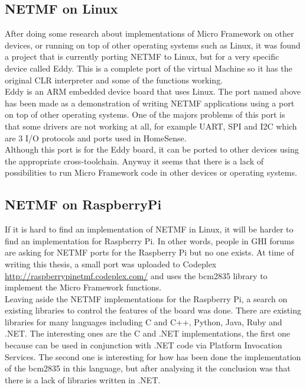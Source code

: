 \subsection{NETMF on Linux}\label{S:SOTA-NETMF-Linux}
After doing some research about implementations of Micro Framework on other devices, or running on top of other operating systems such as Linux, it was found a project that is currently porting NETMF to Linux, but for a very specific device called Eddy. This is a complete port of the virtual Machine so it has the original CLR interpreter and some of the functions working.
\\
Eddy is an ARM embedded device board that uses Linux. The port named above has been made as a demonstration of writing NETMF applications using a port on top of other operating systems. One of the majors problems of this port is that some drivers are not working at all, for example UART, SPI and \gls{I2C} which are 3 I/O protocols and ports used in HomeSense.
\\
Although this port is for the Eddy board, it can be ported to other devices using the appropriate cross-toolchain. Anyway it seems that there is a lack of possibilities to run Micro Framework code in other devices or operating systems.

\subsection{NETMF on RaspberryPi}\label{S:SOTA-NETMF-RPI}
If it is hard to find an implementation of NETMF in Linux, it will be harder to find an implementation for Raspberry Pi. In other words, people in GHI forums are asking for NETMF ports for the Raspberry Pi but no one exists. At time of writing this thesis, a small port was uploaded to Codeplex \url{http://raspberrypinetmf.codeplex.com/} and uses the bcm2835 library to implement the Micro Framework functions.
\\
Leaving aside the NETMF implementations for the Raspberry Pi, a search on existing libraries to control the features of the board was done. There are existing libraries for many languages including C and C++, Python, Java, Ruby and .NET. The interesting ones are the C and .NET implementations, the first one because can be used in conjunction with .NET code via Platform Invocation Services. The second one is interesting for how has been done the implementation of the bcm2835 in this language, but after analysing it the conclusion was that there is a lack of libraries written in .NET.